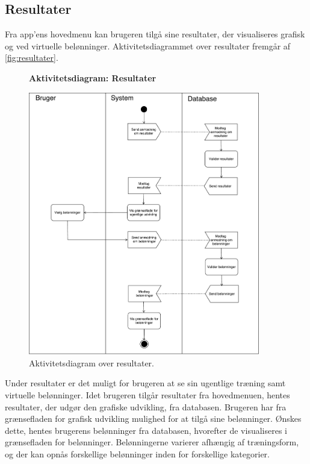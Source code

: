 \subsection*{Resultater}
Fra app'ens hovedmenu kan brugeren tilgå sine resultater, der visualiseres grafisk og ved virtuelle belønninger.
Aktivitetsdiagrammet over resultater fremgår af \autoref{fig:resultater}.

\begin{figure} [H]
\centering
\textbf{Aktivitetsdiagram: Resultater}\par\medskip
\includegraphics[width=0.9\textwidth]{figures/aktivitetsdiagram/Resultater}
\caption{Aktivitetsdiagram over resultater.}
\label{fig:resultater}
\end{figure}

\noindent
Under resultater er det muligt for brugeren at se sin ugentlige træning samt virtuelle belønninger. Idet brugeren tilgår resultater fra hovedmenuen, hentes resultater, der udgør den grafiske udvikling, fra databasen. Brugeren har fra grænsefladen for grafisk udvikling mulighed for at tilgå sine belønninger. Ønskes dette, hentes brugerens belønninger fra databasen, hvorefter de visualiseres i grænsefladen for belønninger. Belønningerne varierer afhængig af træningsform, og der kan opnås forskellige belønninger inden for forskellige kategorier. 

%
%
